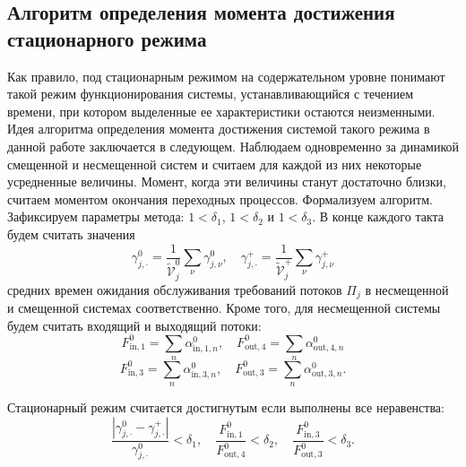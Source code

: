 \documentclass{report}
\begin{document}
\subsection{Алгоритм определения момента достижения стационарного режима}
Как правило, под стационарным режимом на содержательном уровне понимают такой режим функционирования системы, устанавливающийся с течением времени, при котором выделенные ее характеристики остаются неизменными. Идея алгоритма определения момента достижения системой такого режима в данной работе заключается в следующем. Наблюдаем одновременно за динамикой смещенной и несмещенной систем и считаем для каждой из них некоторые усредненные величины. Момент, когда эти величины станут достаточно близки, считаем моментом окончания переходных процессов. Формализуем алгоритм. Зафиксируем параметры метода:  $1 < \delta_1$, $1 < \delta_2$ и $1 < \delta_3$. В конце каждого такта будем считать значения 
\begin{equation}
   \gamma_{j,\cdot}^0 = \frac{1}{\tilde{\mathcal{V}}_j^0}\sum_{\nu} \gamma_{j,\nu}^0, \quad \gamma_{j,\cdot}^+ = \frac{1}{\tilde{\mathcal{V}}_j^+}\sum_{\nu} \gamma_{j,\nu}^+ 
\end{equation}
средних времен ожидания обслуживания требований потоков $\Pi_j$ в несмещенной и смещенной системах соответственно. Кроме того, для несмещенной системы будем считать входящий и выходящий потоки:
\begin{equation}
    F^{0}_{\text{in},1} = \sum_n \alpha^{0}_{\text{in},1,n}, \quad 
    F^{0}_{\text{out},4} = \sum_n \alpha^{0}_{\text{out},4,n}
\end{equation}
\begin{equation}
    F^{0}_{\text{in},3} = \sum_n \alpha^{0}_{\text{in},3,n}, \quad 
    F^{0}_{\text{out},3} = \sum_n \alpha^{0}_{\text{out},3,n}.
\end{equation}


Стационарный режим считается достигнутым если выполнены все неравенства:
\begin{equation}
    \frac{|\gamma_{j,\cdot}^0 - \gamma_{j,\cdot}^+|}{\gamma_{j,\cdot}^0} < \delta_1, \quad
    \frac{F^{0}_{\text{in},1}}{F^{0}_{\text{out},4}} < \delta_2, \quad 
    \frac{F^{0}_{\text{in},3}}{F^{0}_{\text{out},3}} < \delta_3.
\end{equation}
\end{document}
